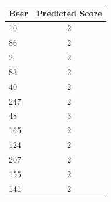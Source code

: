 \begin{table}
\centering
\begin{tabular}{lc}
\hline
Beer & Predicted Score \\
\hline
10 & 2 \\
86 & 2 \\
2 & 2 \\
83 & 2 \\
40 & 2 \\
247 & 2 \\
48 & 3 \\
165 & 2 \\
124 & 2 \\
207 & 2 \\
155 & 2 \\
141 & 2 \\
\hline
\end{tabular}
\end{table}